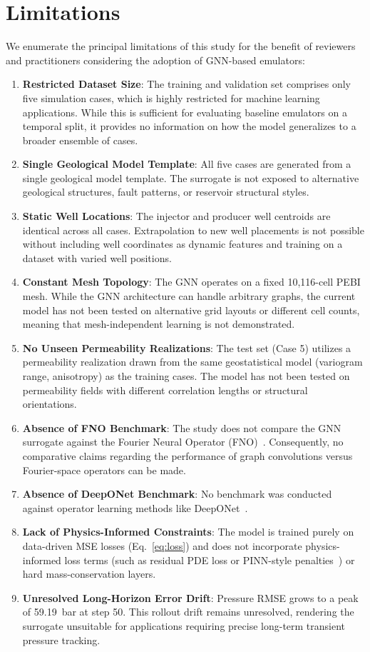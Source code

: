 \documentclass[10pt,twocolumn]{article}
\begin{document}
\section{Limitations}
We enumerate the principal limitations of this study for the benefit of reviewers and practitioners considering the adoption of GNN-based emulators:
\begin{enumerate}
    \item \textbf{Restricted Dataset Size}: The training and validation set comprises only five simulation cases, which is highly restricted for machine learning applications. While this is sufficient for evaluating baseline emulators on a temporal split, it provides no information on how the model generalizes to a broader ensemble of cases.
    \item \textbf{Single Geological Model Template}: All five cases are generated from a single geological model template. The surrogate is not exposed to alternative geological structures, fault patterns, or reservoir structural styles.
    \item \textbf{Static Well Locations}: The injector and producer well centroids are identical across all cases. Extrapolation to new well placements is not possible without including well coordinates as dynamic features and training on a dataset with varied well positions.
    \item \textbf{Constant Mesh Topology}: The GNN operates on a fixed 10,116-cell PEBI mesh. While the GNN architecture can handle arbitrary graphs, the current model has not been tested on alternative grid layouts or different cell counts, meaning that mesh-independent learning is not demonstrated.
    \item \textbf{No Unseen Permeability Realizations}: The test set (Case 5) utilizes a permeability realization drawn from the same geostatistical model (variogram range, anisotropy) as the training cases. The model has not been tested on permeability fields with different correlation lengths or structural orientations.
    \item \textbf{Absence of FNO Benchmark}: The study does not compare the GNN surrogate against the Fourier Neural Operator (FNO)~\cite{li2020fno}. Consequently, no comparative claims regarding the performance of graph convolutions versus Fourier-space operators can be made.
    \item \textbf{Absence of DeepONet Benchmark}: No benchmark was conducted against operator learning methods like DeepONet~\cite{lu2021deeponet}.
    \item \textbf{Lack of Physics-Informed Constraints}: The model is trained purely on data-driven MSE losses (Eq.~\ref{eq:loss}) and does not incorporate physics-informed loss terms (such as residual PDE loss or PINN-style penalties~\cite{raissi2019pinn}) or hard mass-conservation layers.
    \item \textbf{Unresolved Long-Horizon Error Drift}: Pressure RMSE grows to a peak of 59.19~bar at step 50. This rollout drift remains unresolved, rendering the surrogate unsuitable for applications requiring precise long-term transient pressure tracking.
\end{enumerate}
\end{document}
